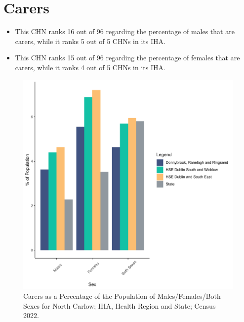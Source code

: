 \documentclass{article}
\begin{document}
\section{Carers}\label{sect:Carers}
\begin{itemize}
\item This CHN ranks  16 out of 96 regarding the percentage of males that are carers, while it ranks   5 out of 5 CHNs in its IHA.
\item This CHN ranks  15 out of 96 regarding the percentage of females that are carers, while it ranks   4 out of 5 CHNs in its IHA.
\end{itemize}
\begin{figure}[H]
	\centering
	\includegraphics[width = 150mm]{../figures/CareED.pdf}
	\caption{Carers as a Percentage of the Population of Males/Females/Both Sexes for North Carlow; IHA, Health Region and State; Census 2022.}
	\label{fig:2ae19629-1a6a-13a3-e055-000000000001}
	\end{figure}
\end{document}
